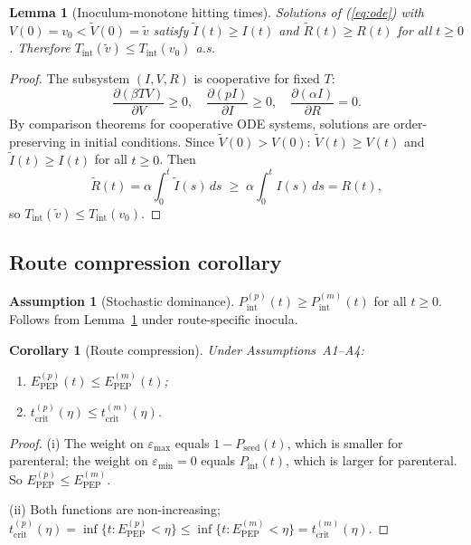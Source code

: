 \documentclass[11pt]{article}
\newtheorem{lemma}{Lemma}[section]
\newtheorem{corollary}{Corollary}[section]
\theoremstyle{definition}
\newtheorem{assumption}{Assumption}[section]
\theoremstyle{remark}
\newcommand{\Tint}{T_{\text{int}}}
\newcommand{\Pseed}{P_{\text{seed}}}
\newcommand{\Pint}{P_{\text{int}}}
\newcommand{\Epep}{E_{\text{PEP}}}
\newcommand{\tcrit}{t_{\text{crit}}}
\newcommand{\emax}{\varepsilon_{\max}}
\newcommand{\emin}{\varepsilon_{\min}}
\begin{document}
\begin{lemma}[Inoculum-monotone hitting times]\label{lem:monotone}
Solutions of (\ref{eq:ode}) with $V(0) = v_{0} < \tilde{V}(0) = \tilde{v}$ satisfy $\tilde{I}(t) \geq I(t)$ and $\tilde{R}(t) \geq R(t)$ for all $t \geq 0$. Therefore $\Tint(\tilde{v}) \leq \Tint(v_{0})$ a.s.
\end{lemma}

\begin{proof}
The subsystem $(I, V, R)$ is cooperative for fixed $T$:
\[
\frac{\partial(\beta TV)}{\partial V} \geq 0, \quad
\frac{\partial(pI)}{\partial I} \geq 0, \quad
\frac{\partial(\alpha I)}{\partial R} = 0.
\]
By comparison theorems for cooperative ODE systems\cite{smith1995}, solutions are order-preserving in initial conditions. Since $\tilde{V}(0) > V(0)$: $\tilde{V}(t) \geq V(t)$ and $\tilde{I}(t) \geq I(t)$ for all $t \geq 0$. Then
\[
\tilde{R}(t) = \alpha \int_{0}^{t} \tilde{I}(s)\,ds \;\geq\; \alpha \int_{0}^{t} I(s)\,ds = R(t),
\]
so $\Tint(\tilde{v}) \leq \Tint(v_{0})$.
\end{proof}

\subsection{Route compression corollary}

\begin{assumption}[Stochastic dominance]
$\Pint^{(p)}(t) \geq \Pint^{(m)}(t)$ for all $t \geq 0$. Follows from Lemma~\ref{lem:monotone} under route-specific inocula.
\end{assumption}

\begin{corollary}[Route compression]\label{cor:route}
Under Assumptions~A1--A4:
\begin{enumerate}[label=\textnormal{(\roman*)},leftmargin=2.5em]
    \item $\Epep^{(p)}(t) \leq \Epep^{(m)}(t)$;
    \item $\tcrit^{(p)}(\eta) \leq \tcrit^{(m)}(\eta)$.
\end{enumerate}
\end{corollary}

\begin{proof}
(i) The weight on $\emax$ equals $1 - \Pseed(t)$, which is smaller for parenteral; the weight on $\emin = 0$ equals $\Pint(t)$, which is larger for parenteral. So $\Epep^{(p)} \leq \Epep^{(m)}$.

(ii) Both functions are non-increasing; $\tcrit^{(p)}(\eta) = \inf\{t : \Epep^{(p)} < \eta\} \leq \inf\{t : \Epep^{(m)} < \eta\} = \tcrit^{(m)}(\eta)$.
\end{proof}
\end{document}
